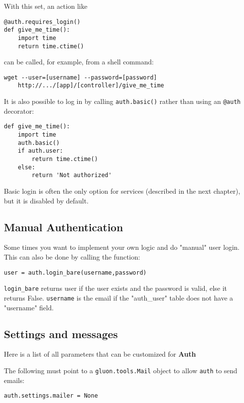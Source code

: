 \documentclass[justified,sixbynine,notoc]{tufte-book}
\def\ft{\small\tt}
\begin{document}
\begin{fullwidth}
With this set, an action like
\begin{lstlisting}
@auth.requires_login()
def give_me_time():
    import time
    return time.ctime()
\end{lstlisting}
\noindent can be called, for example, from a shell command:
\begin{lstlisting}
wget --user=[username] --password=[password]
    http://.../[app]/[controller]/give_me_time
\end{lstlisting}

It is also possible to log in by calling {\ft auth.basic()} rather than using an {\ft @auth} decorator:
\begin{lstlisting}
def give_me_time():
    import time
    auth.basic()
    if auth.user:
        return time.ctime()
    else:
        return 'Not authorized'
\end{lstlisting}

Basic login is often the only option for services (described in the next chapter), but it is disabled by default.

\goodbreak\subsection{Manual Authentication}

Some times you want to implement your own logic and do "manual" user login.
This can also be done by calling the function:

\begin{lstlisting}
user = auth.login_bare(username,password)
\end{lstlisting}

{\ft login\_bare} returns user if the user exists and the password is valid, else it returns False. {\ft username} is the email if the "auth\_user" table does not have a "username" field.

\goodbreak\subsection{Settings and messages}

Here is a list of all parameters that can be customized for {\bf Auth}

The following must point to a {\ft gluon.tools.Mail} object to allow {\ft auth} to send emails:

\begin{lstlisting}
auth.settings.mailer = None
\end{lstlisting}


\end{fullwidth}
\end{document}
